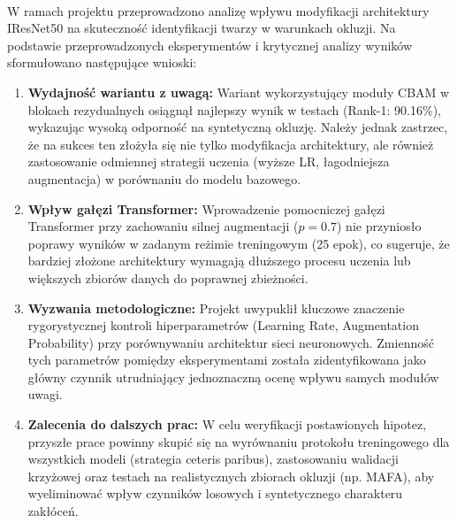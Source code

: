 \paragraph{}W ramach projektu przeprowadzono analizę wpływu modyfikacji architektury IResNet50 na skuteczność identyfikacji twarzy w warunkach okluzji. Na podstawie przeprowadzonych eksperymentów i krytycznej analizy wyników sformułowano następujące wnioski:

\begin{enumerate}
    \item \textbf{Wydajność wariantu z uwagą:} Wariant wykorzystujący moduły CBAM w blokach rezydualnych osiągnął najlepszy wynik w testach (Rank-1: 90.16\%), wykazując wysoką odporność na syntetyczną okluzję. Należy jednak zastrzec, że na sukces ten złożyła się nie tylko modyfikacja architektury, ale również zastosowanie odmiennej strategii uczenia (wyższe LR, łagodniejsza augmentacja) w porównaniu do modelu bazowego.
    \item \textbf{Wpływ gałęzi Transformer:} Wprowadzenie pomocniczej gałęzi Transformer przy zachowaniu silnej augmentacji ($p=0.7$) nie przyniosło poprawy wyników w zadanym reżimie treningowym (25 epok), co sugeruje, że bardziej złożone architektury wymagają dłuższego procesu uczenia lub większych zbiorów danych do poprawnej zbieżności.
    \item \textbf{Wyzwania metodologiczne:} Projekt uwypuklił kluczowe znaczenie rygorystycznej kontroli hiperparametrów (Learning Rate, Augmentation Probability) przy porównywaniu architektur sieci neuronowych. Zmienność tych parametrów pomiędzy eksperymentami została zidentyfikowana jako główny czynnik utrudniający jednoznaczną ocenę wpływu samych modułów uwagi.
    \item \textbf{Zalecenia do dalszych prac:} W celu weryfikacji postawionych hipotez, przyszłe prace powinny skupić się na wyrównaniu protokołu treningowego dla wszystkich modeli (strategia ceteris paribus), zastosowaniu walidacji krzyżowej oraz testach na realistycznych zbiorach okluzji (np. MAFA), aby wyeliminować wpływ czynników losowych i syntetycznego charakteru zakłóceń.
\end{enumerate}
